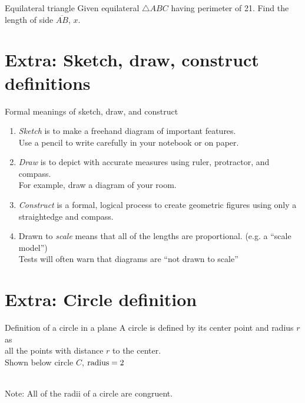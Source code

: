 \documentclass[onlytextwidth]{beamer}
\begin{document}
\begin{frame}{Equilateral triangle}
  Given equilateral $\triangle ABC$ having perimeter of 21. Find the length of side $\overline{AB}$, $x$. \vspace{1cm}
  \begin{center}
  \end{center}
\end{frame}

\section{Extra: Sketch, draw, construct definitions}
\begin{frame}{Formal meanings of sketch, draw, and construct}
  \begin{enumerate}
    \item \emph{Sketch} is to make a freehand diagram of important features. \\[0.15cm]
    Use a pencil to write carefully in your notebook or on paper.  \smallskip
    \item \emph{Draw}  is to depict with accurate measures using ruler, protractor, and compass.\\[0.15cm]
    For example, draw a diagram of your room. \smallskip
    \item \emph{Construct} is a formal, logical process to create geometric figures using only a straightedge and compass. \smallskip
    \item Drawn to \emph{scale} means that all of the lengths are proportional. (e.g. a ``scale model'')\\[0.15cm]
    Tests will often warn that diagrams are ``not drawn to scale''
  \end{enumerate}
\end{frame}

\section{Extra: Circle definition}
\begin{frame}{Definition of a circle in a plane}
  A circle is defined by its center point and radius $r$ as\\
  all the points with distance $r$ to the center. \\[0.5cm]
  Shown below circle $C$, $\rm{radius}=2$\\[0.5cm]
    \\
  Note: All of the radii of a circle are congruent.
    \end{frame}
  
\end{document}
